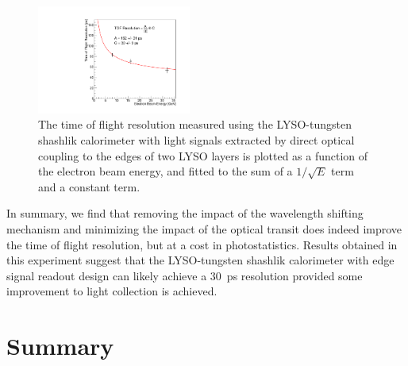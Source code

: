 \documentclass[11pt]{article}
\begin{document}
\begin{figure}[h] \centering
\includegraphics[width=0.45\textwidth]{figs/TimeResolutionVsEnergy_ShashlikSideReadout} 
\caption{ The time of flight resolution measured using the LYSO-tungsten shashlik calorimeter
with light signals extracted by direct optical coupling to the edges of two LYSO layers 
is plotted as a function of the electron beam energy, and fitted to the sum 
of a $1/\sqrt{E}$ term and a constant term. }
\label{fig:ShashlikSideReadoutTOFResolutionVsEnergy}
\end{figure}

In summary, we find that removing the impact of the wavelength shifting mechanism
and minimizing the impact of the optical transit does indeed improve the time
of flight resolution, but at a cost in photostatistics. Results obtained in this
experiment suggest that the LYSO-tungsten shashlik calorimeter with edge
signal readout design can likely achieve a $30$~ps resolution provided 
some improvement to light collection is achieved.

\section{Summary}
\end{document}

